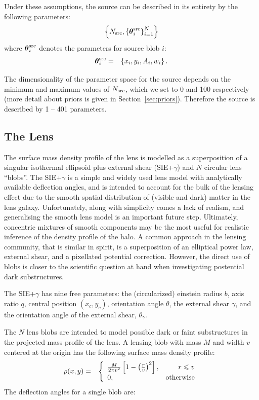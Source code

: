 \documentclass[useAMS,usenatbib]{mn2e}
\begin{document}
Under these assumptions, the source can be described in its entirety
by the following parameters:
\begin{eqnarray}
\left\{
N_{\rm src}, \left\{\boldsymbol{\theta}^{\rm src}_i\right\}_{i=1}^N
\right\}
\end{eqnarray}
where $\boldsymbol{\theta}^{\rm src}_i$ denotes the parameters for source blob $i$:
\begin{eqnarray}
\boldsymbol{\theta}^{\rm src}_i &=& \left\{x_i, y_i, A_i, w_i
\right\}.
\end{eqnarray}

The dimensionality of the parameter space for the source depends on the
minimum and maximum values of $N_{\rm src}$, which we set to 0 and 100
respectively (more detail about priors is given in Section~\ref{sec:priors}).
Therefore the source is described by 1 -- 401 parameters.

\subsection{The Lens}
The surface mass density profile of the lens is modelled as a superposition
of a singular isothermal ellipsoid plus external shear (SIE+$\gamma$) and
$N$ circular lens ``blobs''. The SIE+$\gamma$ is a simple and widely used lens
model with analytically available deflection angles, and is intended to account
for the bulk of the lensing effect due to the smooth spatial distribution
of (visible and dark) matter in the lens galaxy. Unfortunately, along with
simplicity comes a lack of realism, and generalising the smooth lens model
is an important future step. Ultimately, concentric
mixtures of smooth components may be the most useful for realistic inference
of the density profile of the halo. A common approach in the lensing
community, that is similar in spirit, is a superposition of an elliptical
power law, external shear, and a pixellated potential correction. However, the
direct use of blobs is closer to the scientific question at hand
when investigating postential dark substructures.

The SIE+$\gamma$ has nine free parameters:
the (circularized) einstein radius $b$, axis ratio $q$, central position
$(x_c, y_c)$, orientation angle $\theta$, the external shear $\gamma$, and the
orientation angle of the external shear, $\theta_{\gamma}$.

The $N$ lens blobs are intended to model possible dark or faint substructures
in the projected mass profile of the lens.
A lensing blob with mass $M$ and width $v$
centered at the origin has the following surface mass density profile:
\begin{eqnarray}
\rho(x, y) &=& \left\{
\begin{array}{lr}
\frac{M}{2\pi v^2}\left[1 - \left(\frac{r}{v}\right)^2\right], & r \leq v\\
0, & \textnormal{otherwise}
\end{array}
\right.
\end{eqnarray}
The deflection angles for a single blob are:
\end{document}
